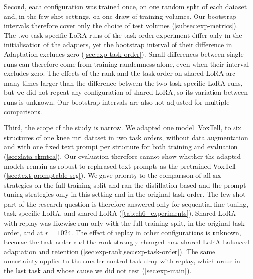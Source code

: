 Second, each configuration was trained once, on one random split of each dataset and, in the few-shot settings, on one draw of training volumes.
Our bootstrap intervals therefore cover only the choice of test volumes (\cref{subsec:exp-metrics}).
The two task-specific LoRA runs of the task-order experiment differ only in the initialisation of the adapters, yet the bootstrap interval of their difference in Adaptation excludes zero (\cref{sec:exp-task-order}).
Small differences between single runs can therefore come from training randomness alone, even when their interval excludes zero.
The effects of the rank and the task order on shared LoRA are many times larger than the difference between the two task-specific LoRA runs, but we did not repeat any configuration of shared LoRA, so its variation between runs is unknown.
Our bootstrap intervals are also not adjusted for multiple comparisons.

Third, the scope of the study is narrow.
We adapted one model, VoxTell, to six structures of one knee \gls{mri} dataset in two task orders, without data augmentation and with one fixed text prompt per structure for both training and evaluation (\cref{sec:data-skmtea}).
Our evaluation therefore cannot show whether the adapted models remain as robust to rephrased text prompts as the pretrained VoxTell (\cref{sec:text-promptable-seg}).
We gave priority to the comparison of all six strategies on the full training split and ran the distillation-based and the prompt-tuning strategies only in this setting and in the original task order.
The few-shot part of the research question is therefore answered only for sequential fine-tuning, task-specific LoRA, and shared LoRA (\cref{tab:ch6_experiments}).
Shared LoRA with replay was likewise run only with the full training split, in the original task order, and at $r = 1024$.
The effect of replay in other configurations is unknown, because the task order and the rank strongly changed how shared LoRA balanced adaptation and retention (\cref{sec:exp-rank,sec:exp-task-order}).
The same uncertainty applies to the smaller control-task drop with replay, which arose in the last task and whose cause we did not test (\cref{sec:exp-main}).

